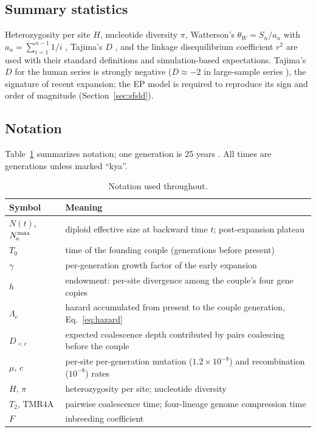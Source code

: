 \subsection{Summary statistics}
Heterozygosity per site $H$, nucleotide diversity $\pi$, Watterson's
$\theta_W = S_n/a_n$ with $a_n = \sum_{i=1}^{n-1} 1/i$
\citep{Watterson1975}, Tajima's $D$ \citep{Tajima1989}, and the linkage
disequilibrium coefficient $r^2$ \citep{HillWeir1988} are used with their
standard definitions and simulation-based expectations. Tajima's $D$ for the
human series is strongly negative
($D \approx -2$ in large-sample series \citep{Tennessen2012}), the
signature of recent expansion; the EP model is required to reproduce its
sign and order of magnitude (Section~\ref{sec:sfsld}).

\subsection{Notation}
Table~\ref{tab:notation} summarizes notation; one generation is 25 years
\citep{Fenner2005,Scally2012}. All times are generations unless marked ``kya''.

\begin{table}[t]
\centering\small
\caption{Notation used throughout.}
\label{tab:notation}
\begin{tabular}{ll}
\toprule
Symbol & Meaning \\
\midrule
$N(t)$, $N_{\mathrm{e}}^{\max}$ & diploid effective size at backward time $t$; post-expansion plateau \\
$T_0$ & time of the founding couple (generations before present) \\
$\gamma$ & per-generation growth factor of the early expansion \\
$h$ & endowment: per-site divergence among the couple's four gene copies \\
$\Lambda_c$ & hazard accumulated from present to the couple generation, Eq.~\eqref{eq:hazard} \\
$D_{<c}$ & expected coalescence depth contributed by pairs coalescing before the couple \\
$\mu$, $c$ & per-site per-generation mutation ($1.2\times10^{-8}$) and recombination ($10^{-8}$) rates \\
$H$, $\pi$ & heterozygosity per site; nucleotide diversity \\
$T_2$, $\mathrm{TMR4A}$ & pairwise coalescence time; four-lineage genome compression time \\
$F$ & inbreeding coefficient \\
\bottomrule
\end{tabular}
\end{table}

